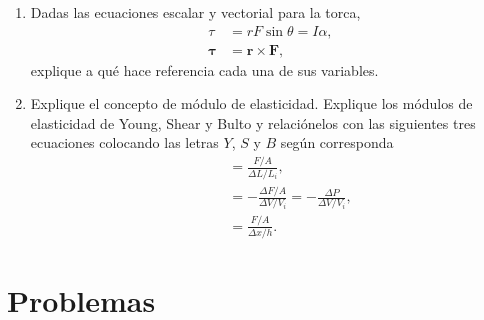 \documentclass{article}
\begin{document}
\begin{enumerate}
\item Dadas las ecuaciones escalar y vectorial para la torca,
\begin{align}
\tau &= rF \sin \theta = I\alpha, \\
\boldsymbol{\tau} &= \boldsymbol{r} \times \boldsymbol{F},
\end{align}
explique a qué hace referencia cada una de sus variables.

\item Explique el concepto de módulo de elasticidad. Explique los módulos de
elasticidad de Young, Shear y Bulto y relaciónelos con las siguientes tres
ecuaciones colocando las letras $Y$, $S$ y $B$ según corresponda
\begin{align}
\qquad &=  \frac{F/A}{\Delta L/L_{i}}, \\
\qquad &= -\frac{\Delta F/A }{\Delta V / V_{i}} 
= -\frac{\Delta P}{\Delta V / V_{i}}, \\
\qquad &=  \frac{F/A}{\Delta x / h}. 
\end{align}

\end{enumerate}



\section{Problemas} %
\label{sec:problemas}
\end{document}
